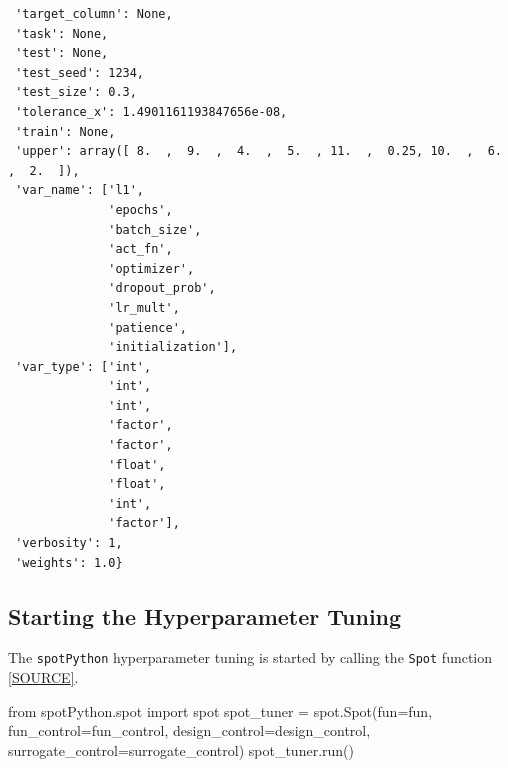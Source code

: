 \documentclass[
  letterpaper,
  DIV=11,
  numbers=noendperiod]{scrreprt}
\newenvironment{Shaded}{\begin{snugshade}}{\end{snugshade}}
\newcommand{\ImportTok}[1]{\textcolor[rgb]{0.00,0.46,0.62}{#1}}
\newcommand{\NormalTok}[1]{\textcolor[rgb]{0.00,0.23,0.31}{#1}}
\newcommand{\OperatorTok}[1]{\textcolor[rgb]{0.37,0.37,0.37}{#1}}
\begin{document}
\begin{verbatim}
 'target_column': None,
 'task': None,
 'test': None,
 'test_seed': 1234,
 'test_size': 0.3,
 'tolerance_x': 1.4901161193847656e-08,
 'train': None,
 'upper': array([ 8.  ,  9.  ,  4.  ,  5.  , 11.  ,  0.25, 10.  ,  6.  ,  2.  ]),
 'var_name': ['l1',
              'epochs',
              'batch_size',
              'act_fn',
              'optimizer',
              'dropout_prob',
              'lr_mult',
              'patience',
              'initialization'],
 'var_type': ['int',
              'int',
              'int',
              'factor',
              'factor',
              'float',
              'float',
              'int',
              'factor'],
 'verbosity': 1,
 'weights': 1.0}
\end{verbatim}

\subsection{Starting the Hyperparameter
Tuning}\label{sec-call-the-hyperparameter-tuner-31}

The \texttt{spotPython} hyperparameter tuning is started by calling the
\texttt{Spot} function
\href{https://github.com/sequential-parameter-optimization/spotPython/blob/main/src/spotPython/spot/spot.py}{{[}SOURCE{]}}.

\begin{Shaded}
\begin{Highlighting}[]
\ImportTok{from}\NormalTok{ spotPython.spot }\ImportTok{import}\NormalTok{ spot}
\NormalTok{spot\_tuner }\OperatorTok{=}\NormalTok{ spot.Spot(fun}\OperatorTok{=}\NormalTok{fun,}
\NormalTok{                       fun\_control}\OperatorTok{=}\NormalTok{fun\_control,}
\NormalTok{                       design\_control}\OperatorTok{=}\NormalTok{design\_control,}
\NormalTok{                       surrogate\_control}\OperatorTok{=}\NormalTok{surrogate\_control)}
\NormalTok{spot\_tuner.run()}
\end{Highlighting}
\end{Shaded}
\end{document}
